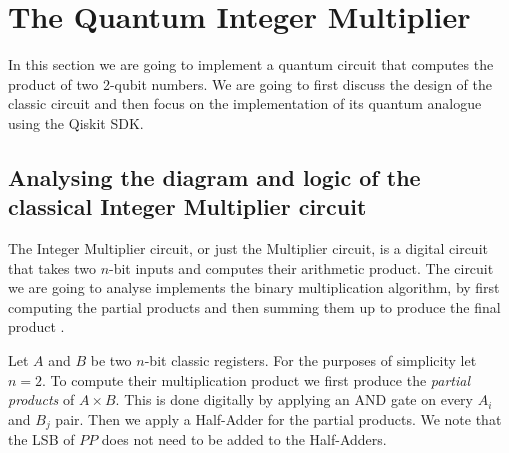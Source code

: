 \newpage
\section{The Quantum Integer Multiplier}

In this section we are going to implement a quantum circuit that computes the product
of two 2-qubit numbers. We are going to first discuss the design of the classic circuit
and then focus on the implementation of its quantum analogue using the Qiskit SDK.

\subsection{Analysing the diagram and logic of the classical Integer Multiplier circuit}

The Integer Multiplier circuit, or just the Multiplier circuit, is a digital circuit that
takes two $n$-bit inputs and computes their arithmetic product. The circuit we are going to
analyse implements the binary multiplication algorithm, by first computing the partial products
and then summing them up to produce the final product \cite{ManoCiletti2018}.

Let $A$ and $B$ be two $n$-bit classic registers. For the purposes of simplicity let $n = 2$.
To compute their multiplication product we first produce the \textit{partial products} of $A \times B$.
This is done digitally by applying an AND gate on every $A_i$ and $B_j$ pair. Then we apply a Half-Adder
for the partial products. We note that the LSB of $PP$ does not need to be added to the Half-Adders.

\begin{table}[ht]
    \centering
    \caption{Multiplication for two 2-bit integers}
\end{table}

